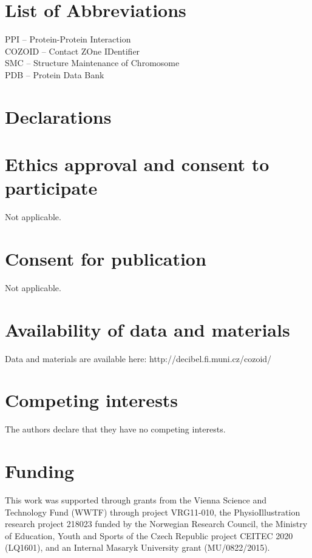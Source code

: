 \documentclass{bmcart}
\begin{document}
\section*{List of Abbreviations}
\begin{backmatter}
PPI -- Protein-Protein Interaction \\
COZOID -- Contact ZOne IDentifier \\
SMC -- Structure Maintenance of Chromosome \\
PDB -- Protein Data Bank \\
\end{backmatter}

\section*{Declarations}
\begin{backmatter}

\section*{Ethics approval and consent to participate}
Not applicable.

\section*{Consent for publication}
Not applicable.

\section*{Availability of data and materials}
Data and materials are available here: http://decibel.fi.muni.cz/cozoid/

\section*{Competing interests}
  The authors declare that they have no competing interests.
	
\section*{Funding}
This work was supported through grants from the Vienna Science and Technology Fund (WWTF) through project VRG11-010, the PhysioIllustration research project 218023 funded by the Norwegian Research Council, the Ministry of Education, Youth and Sports of the Czech Republic project CEITEC 2020 (LQ1601), and an Internal Masaryk University grant (MU/0822/2015). 


\end{backmatter}
\end{document}
